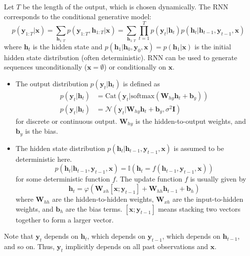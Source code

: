 \documentclass[11pt]{article}
\begin{document}
Let $T$ be the length of the output, which is chosen dynamically. The RNN corresponds to the conditional generative model:
\[
p(\boldsymbol{y}_{1:T} | \boldsymbol{x}) = \sum_{\boldsymbol{h}_{1:T}} p(\boldsymbol{y}_{1:T}, \boldsymbol{h}_{1:T} | \boldsymbol{x})
= \sum_{\boldsymbol{h}_{1:T}} \prod_{t=1}^{T} p(\boldsymbol{y}_t | \boldsymbol{h}_t) p(\boldsymbol{h}_t | \boldsymbol{h}_{t-1}, \boldsymbol{y}_{t-1}, \boldsymbol{x})
\]
where $\boldsymbol{h}_t$ is the hidden state and $p(\boldsymbol{h}_1 | \boldsymbol{h}_0, \boldsymbol{y}_0, \boldsymbol{x}) = p(\boldsymbol{h}_1 | \boldsymbol{x})$ is the initial hidden state distribution (often deterministic).
RNN can be used to generate sequences unconditionally ($\boldsymbol{x} = \emptyset$) or conditionally on $\boldsymbol{x}$.
\begin{itemize}
    \item The output distribution $p(\boldsymbol{y}_t | \boldsymbol{h}_t)$ is defined as
    \[
    \begin{aligned}
    p(\boldsymbol{y}_t | \boldsymbol{h}_t) &= \text{Cat}(\boldsymbol{y}_t | \text{softmax}(\mathbf{W}_{hy} \boldsymbol{h}_t + \boldsymbol{b}_y)) \\
    p(\boldsymbol{y}_t | \boldsymbol{h}_t) &= \mathcal{N}(\boldsymbol{y}_t | \mathbf{W}_{hy} \boldsymbol{h}_t + \boldsymbol{b}_y, \sigma^2 \mathbf{I})
    \end{aligned}
    \]
    for discrete or continuous output. $\mathbf{W}_{hy}$ is the hidden-to-output weights, and $\boldsymbol{b}_y$ is the bias.
    \item The hidden state distribution $p(\boldsymbol{h}_t | \boldsymbol{h}_{t-1}, \boldsymbol{y}_{t-1}, \boldsymbol{x})$ is assumed to be deterministic here.
    \[
    p(\boldsymbol{h}_t | \boldsymbol{h}_{t-1}, \boldsymbol{y}_{t-1}, \boldsymbol{x}) = \mathbb{I}(\boldsymbol{h}_t = f(\boldsymbol{h}_{t-1}, \boldsymbol{y}_{t-1}, \boldsymbol{x}))
    \]
    for some deterministic function $f$. The update function $f$ is usually given by
    \[
    \boldsymbol{h}_t = \varphi(\mathbf{W}_{xh} [\boldsymbol{x}; \boldsymbol{y}_{t-1}] + \mathbf{W}_{hh} \boldsymbol{h}_{t-1} + \boldsymbol{b}_h)
    \]
    where $\mathbf{W}_{hh}$ are the hidden-to-hidden weights, $\mathbf{W}_{xh}$ are the input-to-hidden weights, and $\boldsymbol{b}_h$ are the bias terms.
    $[\boldsymbol{x}; \boldsymbol{y}_{t-1}]$ means stacking two vectors together to form a larger vector.
\end{itemize}
Note that $\boldsymbol{y}_t$ depends on $\boldsymbol{h}_t$, which depends on $\boldsymbol{y}_{t-1}$, which depends on $\boldsymbol{h}_{t-1}$, and so on. 
Thus, $\boldsymbol{y}_t$ implicitly depends on all past observations and $\boldsymbol{x}$.
\end{document}
